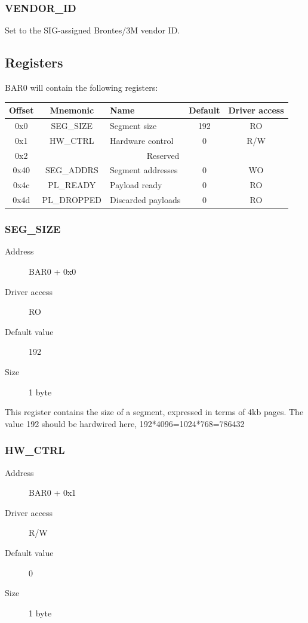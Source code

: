 \documentclass[12pt]{article}
\begin{document}
\subsubsection{VENDOR\_ID}
Set to the SIG-assigned Brontes/3M vendor ID.

\subsection{Registers}

BAR0 will contain the following registers:

\begin{tabular}{|c|c|l|c|c|} \hline
\textbf{Offset} & \textbf{Mnemonic} & \textbf{Name} & \textbf{Default} & \textbf{Driver access} \\ \hline
0x0 & SEG\_SIZE & Segment size & 192 & RO \\ \hline
0x1 & HW\_CTRL & Hardware control & 0 & R/W \\ \hline
0x2 & \multicolumn{4}{|c|}{Reserved} \\ \hline
0x40 & SEG\_ADDRS & Segment addresses & 0 & WO \\ \hline
0x4c & PL\_READY & Payload ready & 0 & RO \\ \hline
0x4d & PL\_DROPPED & Discarded payloads & 0 & RO \\ \hline
\end{tabular}

\subsubsection{SEG\_SIZE}

\begin{description}
\item[Address] BAR0 + 0x0
\item[Driver access] RO
\item[Default value] 192
\item[Size] 1 byte
\end{description}

This register contains the size of a segment, expressed in terms of 4kb pages. The value 192 should be hardwired here, 192*4096=1024*768=786432

\subsubsection{HW\_CTRL}

\begin{description}
\item[Address] BAR0 + 0x1
\item[Driver access] R/W
\item[Default value] 0
\item[Size] 1 byte
\end{description}
\end{document}
